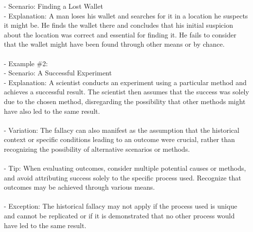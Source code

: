 \documentclass[a4paper,12pt,single,pdftex]{scrartcl}
\begin{document}
    
        - Scenario: Finding a Lost Wallet
    \\

    
        - Explanation: A man loses his wallet and searches for it in a location he suspects it might be. He finds the wallet there and concludes that his initial suspicion about the location was correct and essential for finding it. He fails to consider that the wallet might have been found through other means or by chance.
    \\

    
      
    \\

    
      - Example \#2:
    \\

    
        - Scenario: A Successful Experiment
    \\

    
        - Explanation: A scientist conducts an experiment using a particular method and achieves a successful result. The scientist then assumes that the success was solely due to the chosen method, disregarding the possibility that other methods might have also led to the same result.
    \\

    
      
    \\

    
      - Variation: The fallacy can also manifest as the assumption that the historical context or specific conditions leading to an outcome were crucial, rather than recognizing the possibility of alternative scenarios or methods.
    \\

    
      
    \\

    
      - Tip: When evaluating outcomes, consider multiple potential causes or methods, and avoid attributing success solely to the specific process used. Recognize that outcomes may be achieved through various means.
    \\

    
      
    \\

    
      - Exception: The historical fallacy may not apply if the process used is unique and cannot be replicated or if it is demonstrated that no other process would have led to the same result.
    \\
\end{document}

